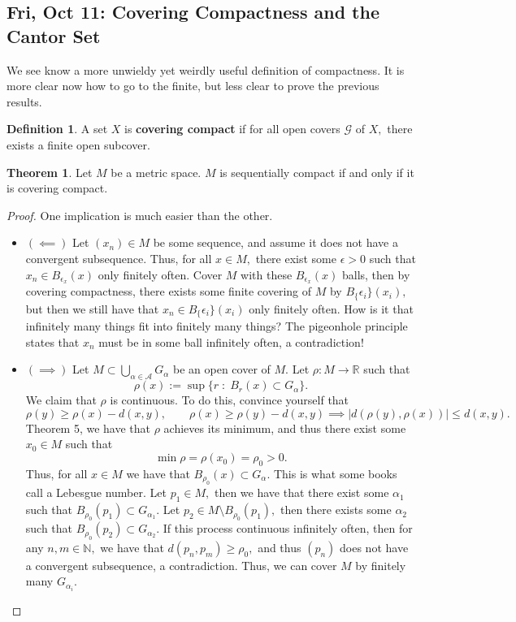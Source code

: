 \documentclass[10pt, oneside]{article}
\newcommand{\bbR}{\mathbb{R}}
\newcommand{\bbN}{\mathbb{N}}
\theoremstyle{definition}
\newtheorem{thm}{Theorem}
\newtheorem{defn}{Definition}
\begin{document}
\subsection{Fri, Oct 11: Covering Compactness and the Cantor Set}
We see know a more unwieldy yet weirdly useful definition of compactness. It is more clear now how to go to the finite, but less clear to prove the previous results.
\begin{defn}
    A set $X$ is \textbf{covering compact} if for all open covers $\mathcal{G}$ of $X,$ there exists a finite open subcover.
\end{defn}
\begin{thm}
    Let $M$ be a metric space. $M$ is sequentially compact if and only if it is covering compact.
\end{thm}
\begin{proof}
    One implication is much easier than the other.
    \begin{itemize}
        \item $(\impliedby)$ Let $(x_n)\in M$ be some sequence, and assume it does not have a convergent subsequence. Thus, for all $x \in M,$ there exist some $\epsilon>0$ such that $x_n \in B_{\epsilon_x}(x)$ only finitely often. Cover $M$ with these $B_{\epsilon_x}(x)$ balls, then by covering compactness, there exists some finite covering of $M$ by $B_\{\epsilon_i\}(x_i),$ but then we still have that $x_n \in B_\{\epsilon_i\}(x_i)$ only finitely often. How is it that infinitely many things fit into finitely many things? The pigeonhole principle states that $x_n$ must be in some ball infinitely often, a contradiction!
        \item $(\implies)$ Let $M \subset \bigcup_{\alpha \in \mathcal{A}} G_\alpha$ be an open cover of $M.$ Let $\rho: M \to \bbR$ such that \[\rho(x) := \sup\{r \; :\; B_r(x)\subset G_\alpha\}.\] We claim that $\rho$ is continuous. To do this, convince yourself that 
        \[\rho(y) \geq \rho(x) - d(x,y), \qquad \rho(x) \geq \rho(y) - d(x,y) \implies |d(\rho(y), \rho(x))|\leq d(x,y).\] Theorem 5, we have that $\rho$ achieves its minimum, and thus there exist some $x_0 \in M$ such that 
        \[\min \rho = \rho(x_0) = \rho_0 >0.\] Thus, for all $x \in M$ we have that $B_{\rho_0}(x)\subset G_\alpha.$ This is what some books call a Lebesgue number. Let $p_1 \in M,$ then we have that there exist some $\alpha_1$ such that $B_{\rho_0}(p_1)\subset G_{\alpha_1}.$ Let $p_2 \in M \setminus B_{\rho_0}(p_1),$ then there exists some $\alpha_2$ such that $B_{\rho_0}(p_2)\subset G_{\alpha_2}.$ If this process continuous infinitely often, then for any $n, m \in \bbN,$ we have that $d(p_n, p_m)\geq \rho_0,$ and thus $(p_n)$ does not have a convergent subsequence, a contradiction. Thus, we can cover $M$ by finitely many $G_{\alpha_i}.$
    \end{itemize}
\end{proof}
\end{document}
